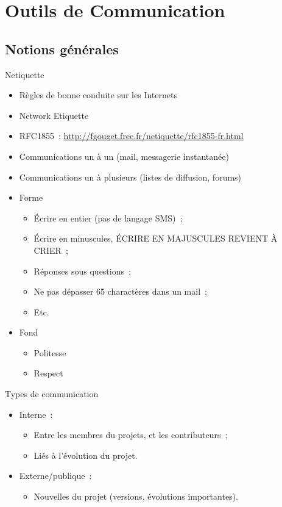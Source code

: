 \section{Outils de Communication}

\subsection{Notions générales}

\begin{frame}[fragile]{Netiquette}
\begin{itemize}[<+->]
 \item Règles de bonne conduite sur les Internets
 \item Network Etiquette
 \item RFC1855~: \url{http://fgouget.free.fr/netiquette/rfc1855-fr.html}
 \item Communications un à un (mail, messagerie instantanée)
 \item Communications un à plusieurs (listes de diffusion, forums)
 \item Forme
 \begin{itemize}[<+->]
  \item Écrire en entier (pas de langage SMS)~;
  \item Écrire en minuscules, ÉCRIRE EN MAJUSCULES REVIENT À CRIER~;
  \item Réponses sous questions~;
  \item Ne pas dépasser 65 charactères dans un mail~;
  \item Etc.
 \end{itemize}
 \item Fond
 \begin{itemize}[<+->]
  \item Politesse
  \item Respect
 \end{itemize}
\end{itemize}
\end{frame}

\begin{frame}{Types de communication}
 \begin{itemize}[<+->]
  \item Interne~:
  \begin{itemize}[<+->]
   \item Entre les membres du projets, et les contributeurs~;
   \item Liés à l'évolution du projet.
  \end{itemize}
  \item Externe/publique~:
  \begin{itemize}
   \item Nouvelles du projet (versions, évolutions importantes).
  \end{itemize}
 \end{itemize}
\end{frame}

